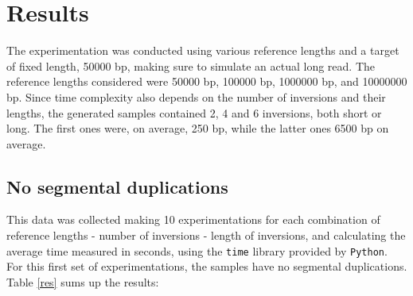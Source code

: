 \section{Results}

The experimentation was conducted using various reference lengths and a target of fixed length, 50000 bp, making sure to simulate an actual long read. The reference lengths considered were 50000 bp, 100000 bp, 1000000 bp, and 10000000 bp. Since time complexity also depends on the number of inversions and their lengths, the generated samples contained 2, 4 and 6 inversions, both short or long. The first ones were, on average, 250 bp, while the latter ones 6500 bp on average. \\

\subsection{No segmental duplications}
This data was collected making 10 experimentations for each combination of reference lengths - number of inversions - length of inversions, and calculating the average time measured in seconds, using the \texttt{time} library provided by \texttt{Python}. For this first set of experimentations, the samples have no segmental duplications. Table \ref{res} sums up the results:

\renewcommand{\arraystretch}{1.2} 

 \begin{table}[h!]
\centering
{}
\caption{Execution times for various reference lengths and target lengths with different numbers of short and long inversions.}
\label{res}
\end{table}

